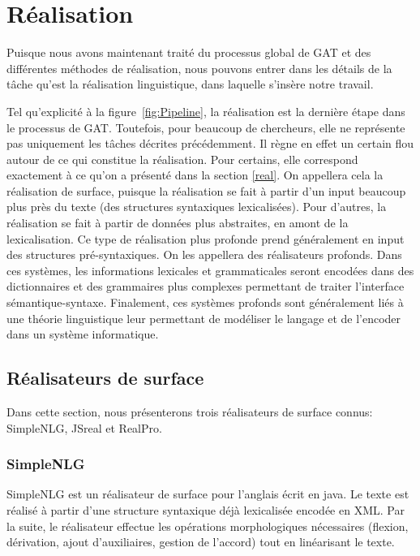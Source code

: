 

\section{Réalisation}

Puisque nous avons maintenant traité du processus global de \ac{GAT} et des différentes méthodes de réalisation, nous pouvons entrer dans les détails de la tâche qu'est la réalisation linguistique, dans laquelle s'insère notre travail.

Tel qu'explicité à la figure~\ref{fig:Pipeline}, la réalisation est la dernière étape dans le processus de \ac{GAT}. Toutefois, pour beaucoup de chercheurs, elle ne représente pas uniquement les tâches décrites précédemment. Il règne en effet un certain flou autour de ce qui constitue la réalisation. Pour certains, elle correspond exactement à ce qu'on a présenté dans la section \ref{real}. On appellera cela la réalisation de surface, puisque la réalisation se fait à partir d'un input beaucoup plus près du texte (des structures syntaxiques lexicalisées). Pour d'autres, la réalisation se fait à partir de données plus abstraites, en amont de la lexicalisation. Ce type de réalisation plus profonde prend généralement en input des structures pré-syntaxiques. On les appellera des réalisateurs profonds. Dans ces systèmes, les informations lexicales et grammaticales seront encodées dans des dictionnaires et des grammaires plus complexes permettant de traiter l'interface sémantique-syntaxe. Finalement, ces systèmes profonds sont généralement liés à une théorie linguistique leur permettant de modéliser le langage et de l'encoder dans un système informatique.


\subsection{Réalisateurs de surface}

Dans cette section, nous présenterons trois réalisateurs de surface connus: SimpleNLG, JSreal et RealPro.

\subsubsection{SimpleNLG}
SimpleNLG \citep{GattSimpleNLGRealisationEngine2009} est un réalisateur de surface pour l'anglais écrit en java. Le texte est réalisé à partir d'une structure syntaxique déjà lexicalisée encodée en XML. Par la suite, le réalisateur effectue les opérations morphologiques nécessaires (flexion, dérivation, ajout d'auxiliaires, gestion de l'accord) tout en linéarisant le texte.

